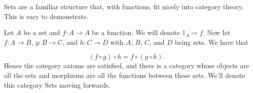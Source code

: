 Sets are a familiar structure that, with functions, fit nicely into category
theory. This is easy to demonstrate.

Let $A$ be a set and $f \colon A \to A$ be a function. We will denote $1_A
\coloneqq f$.  Now let $f \colon A \to B$, $y \colon B \to C$, and $h \colon C
\to D$ with $A$, $B$, $C$, and $D$ being sets. We have that

\begin{equation}
        \left( f \circ g \right) \circ h = f \circ \left( g \circ h \right).
\end{equation}
Hence the category axioms are satisfied, and there is a category whose objects
are all the sets and morphisms are all the functions between those sets. We'll
denote this category Sets moving forwards.
